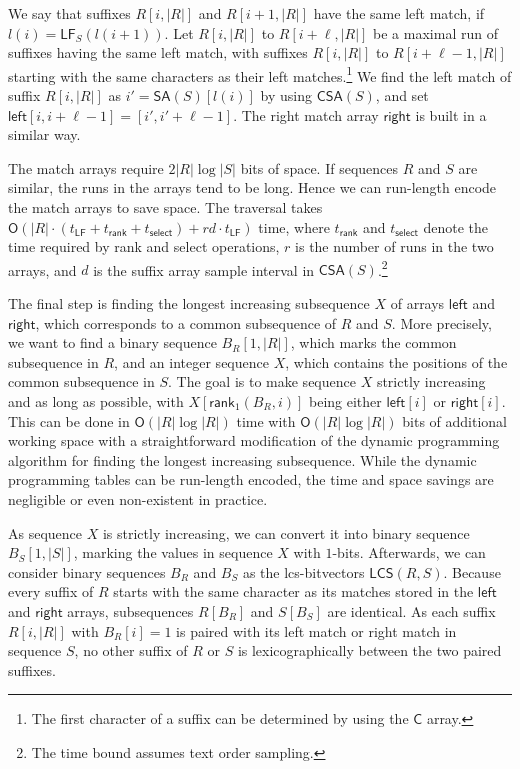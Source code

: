 \documentclass[a4paper,11pt]{llncs}
\newcommand{\abs}[1]{\ensuremath{\lvert #1 \rvert}}
\newcommand{\mSA}{\ensuremath{\mathsf{SA}}}
\newcommand{\mCSA}{\ensuremath{\mathsf{CSA}}}
\newcommand{\mC}{\ensuremath{\mathsf{C}}}
\newcommand{\mLCS}{\ensuremath{\mathsf{LCS}}}
\newcommand{\mleft}{\ensuremath{\mathsf{left}}}
\newcommand{\mright}{\ensuremath{\mathsf{right}}}
\newcommand{\rank}{\textsf{rank}}
\newcommand{\select}{\textsf{select}}
\newcommand{\mLF}{\ensuremath{\mathsf{LF}}}
\newcommand{\mrank}{\ensuremath{\mathsf{rank}}}
\newcommand{\mselect}{\ensuremath{\mathsf{select}}}
\newcommand{\Oh}{\ensuremath{\mathsf{O}}}
\newcommand{\onebit}{$1$\nobreakdash-bit}
\begin{document}
We say that suffixes $R[i,\abs{R}]$ and $R[i+1,\abs{R}]$ have the same left match, if $l(i) = \mLF_{S}(l(i+1))$. Let $R[i,\abs{R}]$ to $R[i+\ell,\abs{R}]$ be a maximal run of suffixes having the same left match, with suffixes $R[i,\abs{R}]$ to $R[i+\ell-1,\abs{R}]$ starting with the same characters as their left matches.\footnote{The first character of a suffix can be determined by using the $\mC$ array.} We find the left match of suffix $R[i,\abs{R}]$ as $i' = \mSA(S)[l(i)]$ by using $\mCSA(S)$, and set $\mleft[i,i+\ell-1] = [i',i'+\ell-1]$. The right match array $\mright$ is built in a similar way.

The match arrays require $2\abs{R} \log \abs{S}$ bits of space. If sequences $R$ and $S$ are similar, the runs in the arrays tend to be long. Hence we can run-length encode the match arrays to save space. The traversal takes $\Oh(\abs{R} \cdot (t_{\mLF} + t_{\mrank} + t_{\mselect}) + rd \cdot t_{\mLF})$ time, where $t_{\mrank}$ and $t_{\mselect}$ denote the time required by \rank{} and \select{} operations, $r$ is the number of runs in the two arrays, and $d$ is the suffix array sample interval in $\mCSA(S)$.\footnote{The time bound assumes text order sampling.}

The final step is finding the longest increasing subsequence $X$ of arrays $\mleft$ and $\mright$, which corresponds to a common subsequence of $R$ and $S$. More precisely, we want to find a binary sequence $B_{R}[1,\abs{R}]$, which marks the common subsequence in $R$, and an integer sequence $X$, which contains the positions of the common subsequence in $S$. The goal is to make sequence $X$ strictly increasing and as long as possible, with $X[\mrank_{1}(B_{R}, i)]$ being either $\mleft[i]$ or $\mright[i]$. This can be done in $\Oh(\abs{R} \log \abs{R})$ time with $\Oh(\abs{R} \log \abs{R})$ bits of additional working space with a straightforward modification of the dynamic programming algorithm for finding the longest increasing subsequence. While the dynamic programming tables can be run-length encoded, the time and space savings are negligible or even non-existent in practice.

As sequence $X$ is strictly increasing, we can convert it into binary sequence $B_{S}[1,\abs{S}]$, marking the values in sequence $X$ with \onebit{}s. Afterwards, we can consider binary sequences $B_{R}$ and $B_{S}$ as the lcs-bitvectors $\mLCS(R,S)$. Because every suffix of $R$ starts with the same character as its matches stored in the $\mleft$ and $\mright$ arrays, subsequences $R[B_{R}]$ and $S[B_{S}]$ are identical. As each suffix $R[i,\abs{R}]$ with $B_{R}[i] = 1$ is paired with its left match or right match in sequence $S$, no other suffix of $R$ or $S$ is lexicographically between the two paired suffixes.
\end{document}
